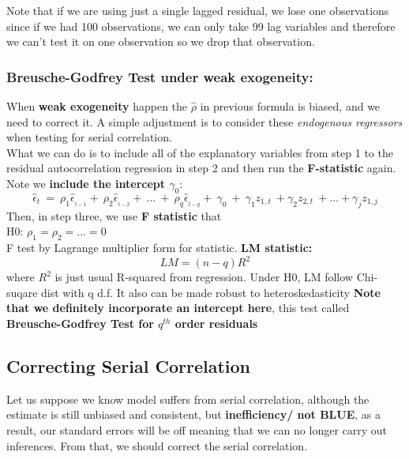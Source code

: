 \documentclass[12pt]{article}
\begin{document}
Note that if we are using just a single lagged residual, we lose one observations since if we had 100 observations, we can only take 99 lag variables and therefore we can’t test it on one observation so we drop that observation.
\\

{\color{RoyalBlue}
\subsubsection{Breusche-Godfrey Test under weak exogeneity:}}

When \textbf{weak exogeneity} happen the $\hat{\rho}$ in previous formula is biased, and we need to correct it. A simple adjustment is to consider these \textit{endogenous regressors} when testing for serial correlation.
\\

What we can do is to include all of the explanatory variables from step 1 to the residual autocorrelation regression in step 2 and then run the \textbf{F-statistic} again. Note we \textbf{include the intercept $\gamma_0$}:
\begin{equation}
    \hat{\epsilon}_t\ =\ \rho_1\hat{\epsilon}_{_{t-1}}+\ \rho_2\hat{\epsilon}_{_{t-2}}+\ ...\ +\ \rho_q\hat{\epsilon}_{_{t-q}}+\ \gamma_0\ +\ \gamma_1z_{1,t}\ +\gamma_2z_{2,t}\ +...+\gamma_jz_{1,j}
\end{equation}
Then, in step three, we use \textbf{F statistic} that \\
H0: $\rho_1 = \rho_2 =... = 0$
\\
F test by Lagrange multiplier form for statistic. \textbf{LM statistic:}
$$LM = (n-q)R^2$$
where $R^2$ is just usual R-squared from regression. Under H0, LM follow Chi-suqare dist with q d.f. It also can be made robust to heteroskedasticity
\textbf{Note that we definitely incorporate an intercept here}, this test called \textbf{Breusche-Godfrey Test for $q^{th}$ order residuals}
\\



{\color{RoyalBlue}
\subsection{Correcting Serial Correlation}}
Let us suppose we know model suffers from serial correlation, although the estimate is still unbiased and consistent, but \textbf{inefficiency/ not BLUE}, as a result, our standard errors will be off meaning that we can no longer carry out inferences. From that, we should correct the serial correlation.
\\
\end{document}
